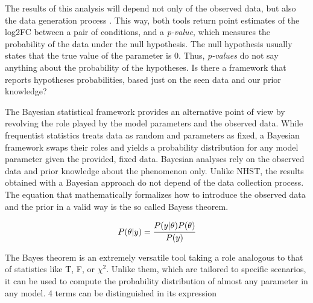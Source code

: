 The results of this analysis will depend not only of the observed data, but also the data generation process \cite{Kruschke}. This way, both tools return point estimates of the \ac{log2FC} between a pair of conditions, and a \textit{p-value}, which measures the probability of the data under the null hypothesis. The null hypothesis usually states that the true value of the parameter is 0. Thus, \textit{p-values} do not say anything about the probability of the hypotheses. Is there a framework that reports hypotheses probabilities, based just on the seen data and our prior knowledge?

The Bayesian statistical framework provides an alternative point of view by revolving the role played by the model parameters and the observed data. While frequentist statistics treats data as random and parameters as fixed, a Bayesian framework swaps their roles and yields a probability distribution for any model parameter given the provided, fixed data. Bayesian analyses rely on the observed data and prior knowledge about the phenomenon only. Unlike \ac{NHST}, the results obtained with a Bayesian approach do not depend of the data collection process. The equation that mathematically formalizes how to introduce the observed data and the prior in a valid way is the so called Bayes\textquotesingle s theorem.

\begin{equation}
P(\theta | y) = \cfrac{P(y | \theta) P(\theta)}{P(y)}
\end{equation}

The Bayes theorem is an extremely versatile tool taking a role analogous to that of statistics like T, F, or $\chi^2$. Unlike them, which are tailored to specific scenarios, it can be used to compute the probability distribution of almost any parameter in any model. 4 terms can be distinguished in its expression

